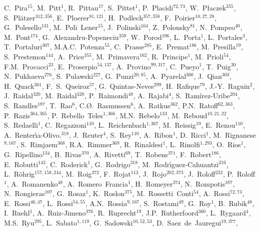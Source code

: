 C.~Pira$^{{15}}$,
M.~Pitt$^{{1}}$,
R.~Pittau$^{{17}}$,
S.~Pittet$^{{1}}$,
P.~Placidi$^{{72, 73}}$,
W.~P{\l}aczek$^{{355}}$,
S.~Pl{\"a}tzer$^{{312, 356}}$,
E.~Ploerer$^{{81, 121}}$,
H.~Podlech$^{{357, 358}}$,
F.~Poirier$^{{10, 27, 28}}$,
G.~Polesello$^{{131}}$,
M.~Poli~Lener$^{{15}}$,
J.~Polinski$^{{164}}$,
Z.~Polonsky$^{{81}}$,
N.~Pompeo$^{{40}}$,
M.~Pont$^{{174}}$,
G.~Alexandru-Popeneciu$^{{359}}$,
W.~Porod$^{{196}}$,
L.~Porta$^{{1}}$,
L.~Portales$^{{3}}$,
T.~Portaluri$^{{307}}$,
M.A.C.~Potenza$^{{55}}$,
C.~Prasse$^{{285}}$,
E.~Premat$^{{186}}$,
M.~Presilla$^{{19}}$,
S.~Prestemon$^{{144}}$,
A.~Price$^{{355}}$,
M.~Primavera$^{{162}}$,
R.~Principe$^{{1}}$,
M.~Prioli$^{{54}}$,
F.M.~Procacci$^{{23}}$,
E.~Proserpio$^{{54, 137}}$,
A.~Provino$^{{99, 317}}$,
C.~Pueyo$^{{1}}$,
T.~Puig$^{{30}}$,
N.~Pukhaeva$^{{276}}$,
S.~Pulawski$^{{227}}$,
G.~Punzi$^{{20, 85}}$,
A.~Pyarelal$^{{360}}$,
J.~Qian$^{{303}}$,
H.~Quack$^{{361}}$,
F.~S.~Queiroz$^{{57}}$,
G.~Quintas-Neves$^{{299}}$,
H.~Rafique$^{{79}}$,
J.-Y.~Raguin$^{{2}}$,
J.~Raidal$^{{320}}$,
M.~Raidal$^{{320}}$,
P.~Raimondi$^{{48}}$,
A.~Rajabi$^{{4}}$,
S.~Ram{\'i}rez-Uribe$^{{204}}$,
S.~Randles$^{{187}}$,
T.~Rao$^{{6}}$,
C.{\O}.~Rasmussen$^{{6}}$,
A.~Ratkus$^{{362}}$,
P.N.~Ratoff$^{{62, 363}}$,
P.~Razis$^{{364, 365}}$,
P.~Rebello~Teles$^{{1, 366}}$,
M.N.~Rebelo$^{{133}}$,
M.~Reboud$^{{10, 21, 22}}$,
S.~Redaelli$^{{1}}$,
C.~Regazzoni$^{{110}}$,
L.~Reichenbach$^{{1, 367}}$,
M.~Reissig$^{{19}}$,
E.~Renou$^{{110}}$,
A.~Renter{\'\i}a-Olivo.$^{{318}}$,
J.~Reuter$^{{4}}$,
S.~Rey$^{{110}}$,
A.~Ribon$^{{1}}$,
D.~Ricci$^{{1}}$,
M.~Rignanese$^{{9, 167}}$,
S.~Rimjaem$^{{368}}$,
R.A.~Rimmer$^{{369}}$,
R.~Rinaldesi$^{{1}}$,
L.~Rinolfi$^{{1, 293}}$,
O.~Rios$^{{1}}$,
G.~Ripellino$^{{134}}$,
B.~Rivas$^{{370}}$,
A.~Rivetti$^{{69}}$,
T.~Robens$^{{371}}$,
F.~Robert$^{{186}}$,
E.~Robutti$^{{143}}$,
C.~Roderick$^{{1}}$,
G.~Rodrigo$^{{318}}$,
M.~Rodr{\'\i}guez-Cahuantzi$^{{216}}$,
L.~R{\"o}hrig$^{{157, 158, 244}}$,
M.~Roig$^{{372}}$,
F.~Rojat$^{{113}}$,
J.~Rojo$^{{202, 373}}$,
J.~Roloff$^{{232}}$,
P.~Roloff$^{{1}}$,
A.~Romanenko$^{{48}}$,
A.~Romero~Francia$^{{1}}$,
H.~Romeyer$^{{374}}$,
N.~Rompotis$^{{187}}$,
N.~Rongieras$^{{107}}$,
G.~Rosaz$^{{1}}$,
K.~Roslon$^{{375}}$,
M.~Rossetti~Conti$^{{54}}$,
A.~Rossi$^{{72, 73}}$,
E.~Rossi$^{{46, 47}}$,
L.~Rossi$^{{54, 55}}$,
A.N.~Rossia$^{{9, 167}}$,
S.~Rostami$^{{49}}$,
G.~Roy$^{{1}}$,
B.~Rubik$^{{48}}$,
I.~Ruehl$^{{1}}$,
A.~Ruiz-Jimeno$^{{376}}$,
R.~Ruprecht$^{{19}}$,
J.P.~Rutherfoord$^{{360}}$,
L.~Rygaard$^{{4}}$,
M.S.~Ryu$^{{295}}$,
L.~Sabato$^{{1, 119}}$,
G.~Sadowski$^{{10, 52, 53}}$,
D.~Saez~de~Jauregui$^{{19, 377}}$,
